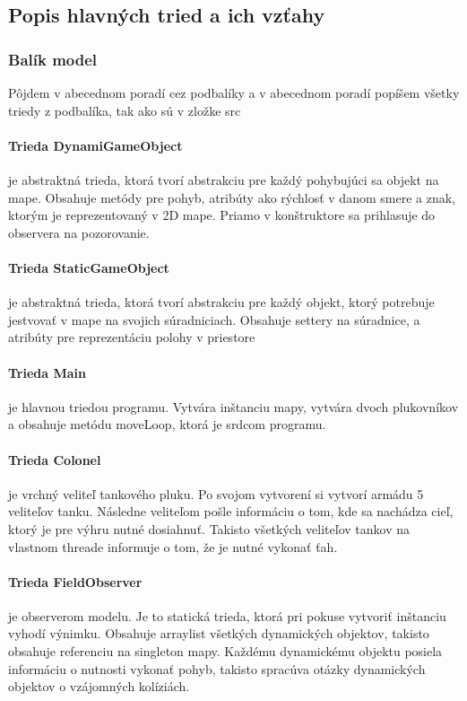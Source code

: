 \documentclass[12pt,oneside,slovak,a4paper]{article}
\begin{document}
\subsection{Popis hlavných tried a ich vzťahy}
\subsubsection{Balík model}
Pôjdem v abecednom poradí cez podbalíky a v abecednom poradí popíšem všetky triedy z podbalíka, tak ako sú v zložke src
\paragraph{Trieda DynamiGameObject} je abstraktná trieda, ktorá tvorí abstrakciu pre každý pohybujúci sa objekt na mape. Obsahuje metódy pre pohyb, atribúty ako rýchlosť v danom smere a znak, ktorým je reprezentovaný v 2D mape. Priamo v konštruktore sa prihlasuje do observera na pozorovanie.
\paragraph{Trieda StaticGameObject} je abstraktná trieda, ktorá tvorí abstrakciu pre každý objekt, ktorý potrebuje jestvovať v mape na svojich súradniciach. Obsahuje settery na súradnice, a atribúty pre reprezentáciu polohy v priestore
\paragraph{Trieda Main} je hlavnou triedou programu. Vytvára inštanciu mapy, vytvára dvoch plukovníkov a obsahuje metódu moveLoop, ktorá je srdcom programu.
\paragraph{Trieda Colonel} je vrchný veliteľ tankového pluku. Po svojom vytvorení si vytvorí armádu 5 veliteľov tanku. Následne veliteľom pošle informáciu o tom, kde sa nachádza cieľ, ktorý je pre výhru nutné dosiahnuť. Takisto všetkých veliteľov tankov na vlastnom threade informuje o tom, že je nutné vykonať ťah.
\paragraph{Trieda FieldObserver} je observerom modelu. Je to statická trieda, ktorá pri pokuse vytvoriť inštanciu vyhodí výnimku. Obsahuje arraylist všetkých dynamických objektov, takisto obsahuje referenciu na singleton mapy. Každému dynamickému objektu posiela informáciu o nutnosti vykonať pohyb, takisto spracúva otázky dynamických objektov o vzájomných kolíziách.
\end{document}
